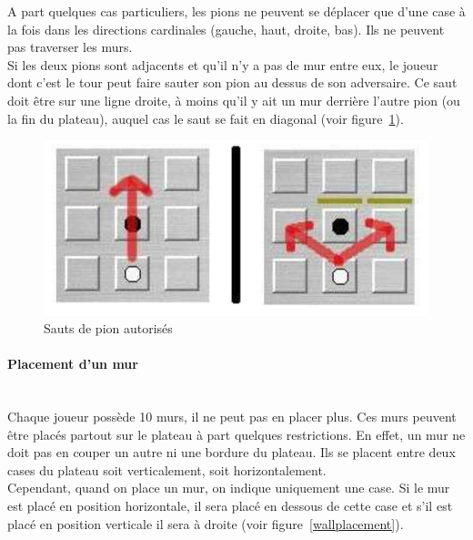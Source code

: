 \documentclass[12pt,a4paper]{article}
\begin{document}
A part quelques cas particuliers, les pions ne peuvent se déplacer que d'une case à 
la fois dans les directions cardinales (gauche, haut, droite, bas). Ils ne peuvent pas
traverser les murs.\\

Si les deux pions sont adjacents et qu'il n'y a pas de mur entre eux, le joueur dont
c'est le tour peut faire sauter son pion au dessus de son adversaire. Ce saut doit
être sur une ligne droite, à moins qu'il y ait un mur derrière l'autre pion (ou la fin du plateau), 
auquel cas le saut se fait en diagonal (voir figure~\ref{jumpMoves}).
\\

\begin{figure}[h]
  \begin{center}
    \includegraphics[scale=0.3]{jumpMoves}
    \caption{Sauts de pion autorisés}
    \label{jumpMoves}
  \end{center}
\end{figure}

\paragraph{Placement d'un mur\\ \\}

Chaque joueur possède 10 murs, il ne peut pas en placer plus. Ces murs
peuvent être placés partout sur le plateau à part quelques restrictions.
En effet, un mur ne doit pas en \og couper \fg{} un autre ni une bordure 
du plateau.
Ils se placent \og entre deux cases \fg{} du plateau soit 
verticalement, soit horizontalement.\\
Cependant, quand on place un mur, on indique uniquement une case. Si
le mur est placé en position horizontale, il sera placé en dessous de cette
case et s'il est placé en position verticale il sera à droite
(voir figure~\ref{wallplacement}).
\\
\end{document}
